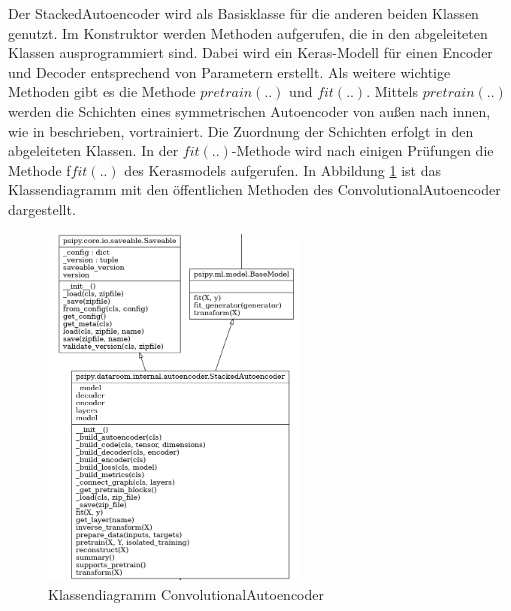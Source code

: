 	Der StackedAutoencoder wird als Basisklasse für die anderen beiden Klassen genutzt. Im Konstruktor werden Methoden aufgerufen, die in den abgeleiteten Klassen ausprogrammiert sind. Dabei wird ein Keras-Modell für einen Encoder und Decoder entsprechend von Parametern erstellt. Als weitere wichtige Methoden gibt es die Methode $pretrain(..)$ und $fit(..)$. Mittels $pretrain(..)$ werden die Schichten eines symmetrischen Autoencoder von außen nach innen, wie in \cite{Bengio.2007} beschrieben, vortrainiert. Die Zuordnung der Schichten erfolgt in den abgeleiteten Klassen.
	In der $fit(..)$-Methode wird nach einigen Prüfungen die Methode f$fit(..)$ \cite{Chollet.2015} des Kerasmodels aufgerufen. In Abbildung \ref{img:KlassendiagrammConvolutionalAutoencoder} ist das Klassendiagramm mit den öffentlichen Methoden des ConvolutionalAutoencoder dargestellt. 
	\begin{figure}[h]
		\centering
		\includegraphics[width=0.6\textwidth, center]{bilder/Klassendiagramme/klassendiagramm_public_cae2.png}
		\caption[Klassendiagramm ConvolutionalAutoencoder]{Klassendiagramm ConvolutionalAutoencoder}
		\label{img:KlassendiagrammConvolutionalAutoencoder}
	\end{figure}  
	

